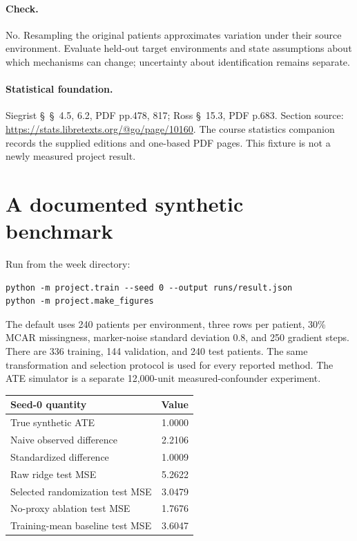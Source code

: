 \documentclass[11pt,oneside]{scrbook}
\begin{document}
\paragraph{Check.} No. Resampling the original patients approximates variation under their source environment. Evaluate held-out target environments and state assumptions about which mechanisms can change; uncertainty about identification remains separate.
\paragraph{Statistical foundation.} Siegrist \S~\S~4.5, 6.2, PDF pp.478, 817; Ross \S~15.3, PDF p.683. Section source: \url{https://stats.libretexts.org/@go/page/10160}. The course statistics companion records the supplied editions and one-based PDF pages. This fixture is not a newly measured project result.


\section{A documented synthetic benchmark}
Run from the week directory:
\begin{verbatim}
python -m project.train --seed 0 --output runs/result.json
python -m project.make_figures
\end{verbatim}
The default uses 240 patients per environment, three rows per patient, 30\% MCAR
missingness, marker-noise standard deviation 0.8, and 250 gradient steps. There are
336 training, 144 validation, and 240 test patients. The same transformation and
selection protocol is used for every reported method. The ATE simulator is a separate
12,000-unit measured-confounder experiment.

\begin{center}
\begin{tabular}{lr}
\toprule
Seed-0 quantity & Value\\
\midrule
True synthetic ATE & 1.0000\\
Naive observed difference & 2.2106\\
Standardized difference & 1.0009\\
Raw ridge test MSE & 5.2622\\
Selected randomization test MSE & 3.0479\\
No-proxy ablation test MSE & 1.7676\\
Training-mean baseline test MSE & 3.6047\\
\bottomrule
\end{tabular}
\end{center}
\end{document}
